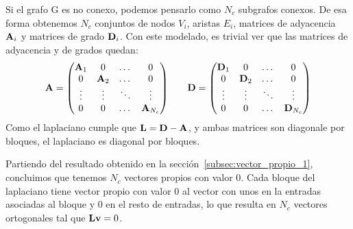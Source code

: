 \documentclass{article}
\begin{document}
Si el grafo G es no conexo, podemos pensarlo como $N_c$ subgrafos conexos. De esa forma
obtenemos $N_c$ conjuntos de nodos $V_i$, aristas $E_i$, matrices de adyacencia $\mathbf{A}_i$ y matrices de grado $\mathbf{D}_i$. Con este modelado, es trivial ver que las matrices de adyacencia y de grados quedan:
\begin{equation*}
    \begin{array}{l c r}
        \mathbf{A} = \left(\begin{matrix}
                             \mathbf{A}_1 & 0      & \dots  & 0          \\
                             0      & \mathbf{A}_2 & \dots  & 0          \\
                             \vdots & \vdots & \ddots & \vdots     \\
                             0      & 0      & \dots  & \mathbf{A}_{N_c}
                         \end{matrix}\right)
         &  &
        \mathbf{D} =\left(\begin{matrix}
                             \mathbf{D}_1 & 0       & \dots  & 0           \\
                             0       & \mathbf{D}_2 & \dots  & 0           \\
                             \vdots  & \vdots  & \ddots & \vdots      \\
                             0       & 0       & \dots  & \mathbf{D}_{N_c}
                         \end{matrix}\right)
    \end{array}
\end{equation*}
Como el laplaciano cumple que $\mathbf{L} = \mathbf{D} - \mathbf{A}$, y ambas matrices son diagonale por bloques, el laplaciano es diagonal por bloques.

Partiendo del resultado obtenido en la sección~\ref{subsec:vector_propio_1}, concluimos que tenemos $N_c$ vectores propios con valor 0. Cada bloque del laplaciano tiene vector propio con valor 0 al vector con unos en la entradas asociadas al bloque y 0 en el resto de entradas, lo que resulta en $N_c$ vectores ortogonales tal que $\mathbf{L} \mathbf{v} = 0$.
\end{document}
